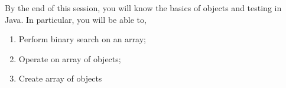 By the end of this session, you will know the basics of objects and testing in Java. In particular, you will be able to,

\begin{enumerate}
\item Perform binary search on an array;
\item Operate on array of objects;
\item Create array of objects
\end{enumerate}
\vskip 0.5cm

\begin{center}
\end{center}


